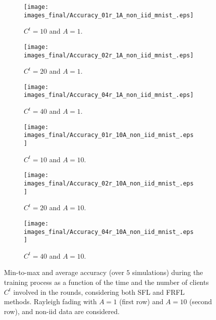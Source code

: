 \documentclass[10pt, conference, letterpaper]{IEEEtran}
\begin{document}
	
	\begin{figure*}[t!]
		\centering
		\begin{subfigure}{0.32\textwidth}
			\centering
			\texttt{[image: images\_final/Accuracy\_01r\_1A\_non\_iid\_mnist\_.eps]} 
			\caption{$C^t=10$ and $A=1$.}
			\label{fig:rayleigh_curve_non_iid_10}
		\end{subfigure}
		\begin{subfigure}{0.32\textwidth}
			\centering
			\texttt{[image: images\_final/Accuracy\_02r\_1A\_non\_iid\_mnist\_.eps]}  
			\caption{$C^t=20$ and $A=1$.}
			\label{fig:20-1-non}
		\end{subfigure}
		\begin{subfigure}{0.32\textwidth}
			\centering
			\texttt{[image: images\_final/Accuracy\_04r\_1A\_non\_iid\_mnist\_.eps]}  
			\caption{$C^t=40$ and $A=1$.}
			\label{fig:40-1-non}
		\end{subfigure}
		\begin{subfigure}{0.32\textwidth}
			\centering
			\texttt{[image: images\_final/Accuracy\_01r\_10A\_non\_iid\_mnist\_.eps]}  
			\caption{$C^t=10$ and $A=10$.}
			\label{fig:}
		\end{subfigure}
		\begin{subfigure}{0.32\textwidth}
			\centering
			\texttt{[image: images\_final/Accuracy\_02r\_10A\_non\_iid\_mnist\_.eps]}  
			\caption{$C^t=20$ and $A=10$.}
			\label{fig:}
		\end{subfigure}
		\begin{subfigure}{0.32\textwidth}
			\centering
			\texttt{[image: images\_final/Accuracy\_04r\_10A\_non\_iid\_mnist\_.eps]}  
			\caption{$C^t=40$ and $A=10$.}
			\label{fig:}
		\end{subfigure}
		\caption{Min-to-max and average accuracy (over $5$ simulations) during the training process as a function of the time and the number of clients $C^t$ involved in the rounds, considering both SFL and FRFL methods. Rayleigh fading with $A=1$ (first row) and $A=10$ (second row), and non-\gls{iid} data are considered.\vspace{-0.18cm}}
		\label{fig:non_iid_rayleigh_curves}
	\end{figure*}
	
\end{document}
